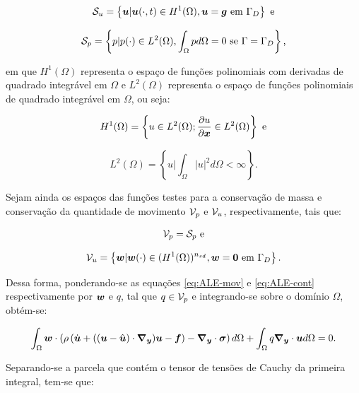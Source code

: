 \begin{equation}
    \mathcal{S}_u=\left\{\boldsymbol{u}|\boldsymbol{u}(\cdot,t)\in H^1(\Omega),\boldsymbol{u}=\boldsymbol{g}\text{ em }\Gamma_D\right\}\text{ e}
\end{equation}

\begin{equation}
    \mathcal{S}_p=\left\{p|p(\cdot)\in L^2(\Omega),\int_\Omega{pd\Omega}=0\text{ se }\Gamma=\Gamma_D\right\}\text{,}
\end{equation}

\noindent em que $H^1(\Omega)$ representa o espaço de funções polinomiais com derivadas de quadrado integrável em $\Omega$ e $L^2(\Omega)$ representa o espaço de funções polinomiais de quadrado integrável em $\Omega$, ou seja:

\begin{equation}
    H^1(\Omega)=\left\{u\in L^2(\Omega);\frac{\partial{u}}{\partial{\boldsymbol{x}}}\in L^2(\Omega)\right\}\text{ e}
\end{equation}

\begin{equation}
    L^2(\Omega)=\left\{u\big|\int_\Omega{|u|^2d\Omega}<\infty\right\}\text{.}
\end{equation}

Sejam ainda os espaços das funções testes para a conservação de massa e conservação da quantidade de movimento $\mathcal{V}_p$ e $\mathcal{V}_u$, respectivamente, tais que:

\begin{equation}
    \mathcal{V}_p=\mathcal{S}_p\text{ e}
\end{equation}

\begin{equation}
    \mathcal{V}_u=\left\{\boldsymbol{w}|\boldsymbol{w}(\cdot)\in(H^1(\Omega))^{n_{sd}},\boldsymbol{w}=\boldsymbol{0}\text{ em }\Gamma_D\right\}\text{.}
\end{equation}

Dessa forma, ponderando-se as equações \eqref{eq:ALE-mov} e \eqref{eq:ALE-cont} respectivamente por $\boldsymbol{w}$ e $q$, tal que $q\in\mathcal{V}_p$ e integrando-se sobre o domínio $\Omega$, obtém-se:

\begin{equation}
    \int_{\Omega}{\boldsymbol{w}\cdot\left({\rho\left({\dot{\boldsymbol{u}}+((\boldsymbol{u}-\hat{\boldsymbol{u}})\cdot\boldsymbol{\nabla_y})\boldsymbol{u}-\boldsymbol{f}}\right)-\boldsymbol{\nabla_y}\cdot\boldsymbol{\sigma}}\right) d\Omega}+\int_{\Omega}{q\boldsymbol{\nabla_y}\cdot\boldsymbol{u} d\Omega}=0\text{.}
\end{equation}

Separando-se a parcela que contém o tensor de tensões de Cauchy da primeira integral, tem-se que:

